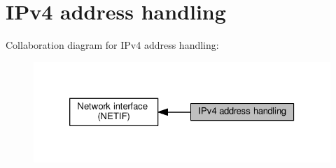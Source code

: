 \hypertarget{group__netif__ip4}{}\section{I\+Pv4 address handling}
\label{group__netif__ip4}
Collaboration diagram for I\+Pv4 address handling\+:
\nopagebreak
\begin{figure}[H]
\begin{center}
\leavevmode
\includegraphics[width=326pt]{group__netif__ip4}
\end{center}
\end{figure}
